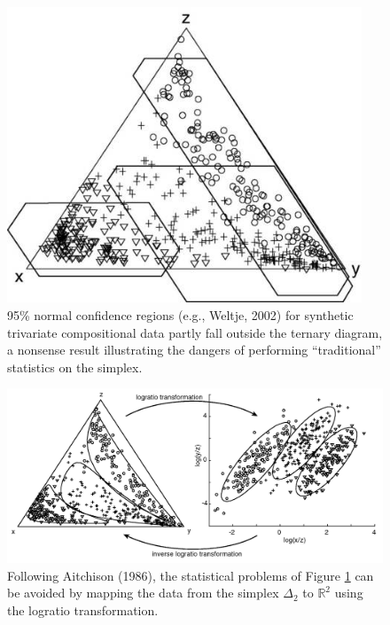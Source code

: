 \begin{figure}[htbp]
  \centering
  \includegraphics[width=400]{figures/closure_ternary_wrong2.jpg}
  \caption[The dangers of using ``traditional'' statistics on the simplex]{
95\%  normal confidence  regions  (e.g., Weltje,  2002) for  synthetic
trivariate compositional data partly fall outside the ternary diagram,
a   nonsense   result   illustrating   the   dangers   of   performing
``traditional'' statistics on the simplex.}
  \label{fig:closure_ternary_wrong}
\end{figure}

\begin{figure}[htbp]
  \centering
  \includegraphics[width=600]{figures/closure_mapping.jpg}
  \caption[Mapping compositional data from $\Delta_2$  to  $\mathbb{R}^2$]{
Following  Aitchison  (1986),   the  statistical  problems  of  Figure
\ref{fig:closure_ternary_wrong}  can be  avoided by  mapping  the data
from  the  simplex $\Delta_2$  to  $\mathbb{R}^2$  using the  logratio
transformation.}
  \label{fig:closure_mapping}
\end{figure}

